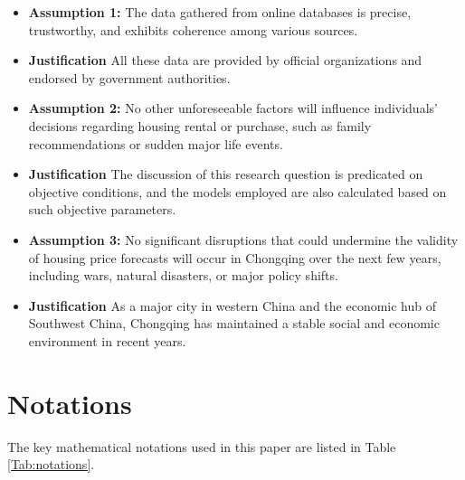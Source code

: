 \documentclass{mcmthesis}
\begin{document}
\begin{itemize}
\item \textbf{Assumption 1:} The data gathered from online databases is precise, trustworthy, and exhibits coherence among various sources. 
\item \textbf{Justification} All these data are provided by official organizations and endorsed by government authorities.

\item \textbf{Assumption 2:} No other unforeseeable factors will influence individuals' decisions regarding housing rental or purchase, 
such as family recommendations or sudden major life events.
\item \textbf{Justification} The discussion of this research question is predicated on objective conditions, 
and the models employed are also calculated based on such objective parameters.

\item \textbf{Assumption 3:} No significant disruptions that 
could undermine the validity of housing price forecasts will occur in Chongqing over the next few years, 
including wars, natural disasters, or major policy shifts.
\item \textbf{Justification} As a major city in western China and the economic hub of Southwest China, 
Chongqing has maintained a stable social and economic environment in recent years.

\end{itemize}

\section{Notations}
The key mathematical notations used in this paper are listed in Table \ref{Tab:notations}. %
\end{document}
